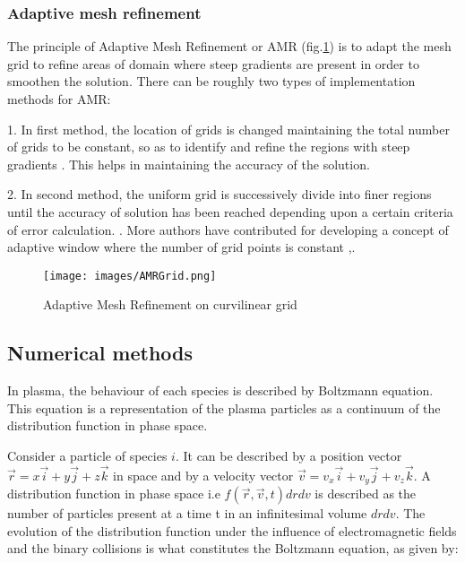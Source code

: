 \documentclass[paper=a4, fontsize=13pt]{scrartcl}
\begin{document}
\subsubsection{Adaptive mesh refinement}

The principle of Adaptive Mesh Refinement or AMR (fig.\ref{fig:AMR grid}) is to adapt the mesh grid to refine areas of domain where steep gradients are present in order to smoothen the solution. There can be roughly two types of implementation methods for AMR:

1. In first method, the location of grids is changed maintaining the total number of grids to be constant, so as to identify and refine the regions with steep gradients \cite{Bessieres2007ADischarges}. This helps in maintaining the accuracy of the solution.

2. In second method, the uniform grid is successively divide into finer regions until the accuracy of solution has been reached depending upon a certain criteria of error calculation. \cite{Djermoune1995TwoDischarge}. More authors have contributed for developing a concept of adaptive window where the number of grid points is constant \cite{Pancheshnyi2001RoleStreamer},\cite{Kulikovsky1998PositiveTransition1.pdf}. 

\begin{figure}
\centering
\texttt{[image: images/AMRGrid.png]}
 \caption{Adaptive Mesh Refinement on curvilinear grid \cite{Henshaw2003AnGrids}}
  \label{fig:AMR grid}
\end{figure}


\subsection{Numerical methods}

In plasma, the behaviour of each species is described by Boltzmann equation. This equation is a representation of the plasma particles as a continuum of the distribution function in phase space. 

Consider a particle of species $i$. It can be described by a position vector $\vec{r} = x \vec{i} + y \vec{j} + z \vec{k}$ in space and by a velocity vector $\vec{v} = v_x \vec{i} + v_y \vec{j} + v_z \vec{k}$. A distribution function in phase space i.e $f(\vec{r},\vec{v},t){dr}{dv}$ is described as the number of particles present at a time t in an infinitesimal volume $dr dv$. The evolution of the distribution function under the influence of electromagnetic fields and the binary collisions is what constitutes the Boltzmann equation, as given by:
\end{document}
